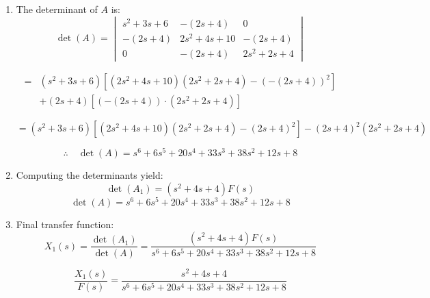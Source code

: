 \documentclass[11pt]{article}
\begin{document}
\begin{enumerate}[label=(\alph*), itemindent=*, leftmargin=*, nolistsep]
    \[
    \therefore \quad \det(A_1) = (s^2 + 4s + 4)F(s)
    \]

    \item The determinant of \( A \) is:
    \[
    \det(A) = \begin{vmatrix}
    s^2 + 3s + 6 & -(2s + 4) & 0 \\
    -(2s + 4) & 2s^2 + 4s + 10 & -(2s + 4) \\
    0 & -(2s + 4) & 2s^2 + 2s + 4
    \end{vmatrix}
    \]

    \[
    \begin{split}
        = {} & (s^2 + 3s + 6) \left[(2s^2 + 4s + 10)(2s^2 + 2s + 4) - (-(2s + 4))^2\right] \\
             & + (2s + 4) \left[(- (2s + 4)) \cdot (2s^2 + 2s + 4)\right]
    \end{split}
    \]
    
    \[
    = (s^2 + 3s + 6) \left[(2s^2 + 4s + 10)(2s^2 + 2s + 4) - (2s + 4)^2\right]
    - (2s + 4)^2 (2s^2 + 2s + 4)
    \]
    
    \[
    \therefore \quad \det(A) = s^6 + 6s^5 + 20s^4 + 33s^3 + 38s^2 + 12s + 8
    \]

    \item Computing the determinants yield:
    \[
    \det(A_1) = (s^2 + 4s + 4)F(s)
    \]
    \[
    \det(A) = s^6 + 6s^5 + 20s^4 + 33s^3 + 38s^2 + 12s + 8
    \]

    \item Final transfer function:
    \[
    X_1(s) = \frac{\det(A_1)}{\det(A)} = \frac{(s^2 + 4s + 4)F(s)}{s^6 + 6s^5 + 20s^4 + 33s^3 + 38s^2 + 12s + 8}
    \]
    
    \[
    \boxed{
    \frac{X_1(s)}{F(s)} = \frac{s^2 + 4s + 4}{s^6 + 6s^5 + 20s^4 + 33s^3 + 38s^2 + 12s + 8}
    }
    \]
\end{enumerate}

\end{document}
